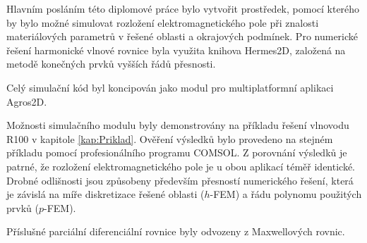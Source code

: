 
Hlavním posláním této diplomové práce bylo vytvořit prostředek, pomocí kterého by bylo možné simulovat rozložení elektromagnetického pole při znalosti materiálových parametrů v řešené oblasti a okrajových podmínek. Pro numerické řešení harmonické vlnové rovnice byla využita knihova Hermes2D, založená na metodě konečných prvků vyšších řádů přesnosti.

Celý simulační kód byl koncipován jako modul pro multiplatformní aplikaci Agros2D.  


Možnosti simulačního modulu byly demonstrovány na příkladu řešení vlnovodu R100 v kapitole \ref{kap:Priklad}. Ověření výsledků bylo provedeno na stejném příkladu pomocí profesionálního programu COMSOL. Z porovnání výsledků je patrné, že rozložení elektromagnetického pole je u obou aplikací téměř identické. Drobné odlišnosti jsou způsobeny především přesností numerického řešení, která je závislá na míře diskretizace řešené oblasti ($h$-FEM) a řádu polynomu použitých prvků ($p$-FEM).

Příslušné parciální diferenciální rovnice byly odvozeny z Maxwellových rovnic.

